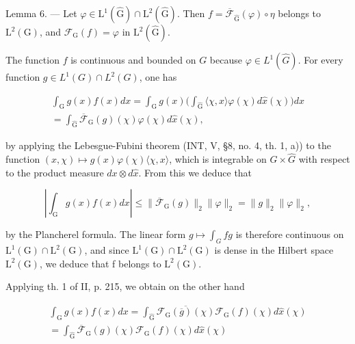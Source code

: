 Lemma 6. — Let \(\varphi\in\mathrm{L}^{1}(\widehat{\mathrm{G}})\cap\mathrm{L}^{2}(\widehat{\mathrm{G}})\). Then \(f=\overline{\mathcal{F}}_{\widehat{\mathrm{G}}}(\varphi)\circ\eta\) belongs to \(\mathrm{L}^{2}(\mathrm{G})\), and \(\mathcal{F}_{\mathrm{G}}(f)=\varphi\) in \(\mathrm{L}^{2}(\widehat{\mathrm{G}})\).

The function \(f\) is continuous and bounded on \(G\) because \(\varphi \in L^{1}(\widehat{G})\). For every function \(g \in L^{1}(G) \cap L^{2}(G)\), one has

\[
\begin{array}{r} \int_ {\mathrm{G}} g (x) f (x) d x = \int_ {\mathrm{G}} g (x) \Big (\int_ {\widehat {\mathrm{G}}} \langle \chi , x \rangle \varphi (\chi) d \widehat {x} (\chi) \Big) d x \\ = \int_ {\widehat {\mathrm{G}}} \overline {{\mathcal {F}}} _ {\mathrm{G}} (g) (\chi) \varphi (\chi) d \widehat {x} (\chi), \end{array}\tag{28}
\]

by applying the Lebesgue-Fubini theorem (INT, V, §8, no. 4, th. 1, a)) to the function \((x,\chi)\mapsto g(x)\varphi(\chi)\langle\chi,x\rangle\), which is integrable on \(G\times\widehat{G}\) with respect to the product measure \(dx\otimes d\widehat{x}\). From this we deduce that

\[
\left| \int_ {\mathrm{G}} g (x) f (x) d x \right| \leqslant \| \overline {{{\mathcal {F}}}} _ {\mathrm{G}} (g) \| _ {2} \| \varphi \| _ {2} = \| g \| _ {2} \| \varphi \| _ {2},
\]

by the Plancherel formula. The linear form \(g \mapsto \int_{G} fg\) is therefore continuous on \(\mathrm{L}^{1}(\mathrm{G}) \cap \mathrm{L}^{2}(\mathrm{G})\), and since \(\mathrm{L}^{1}(\mathrm{G}) \cap \mathrm{L}^{2}(\mathrm{G})\) is dense in the Hilbert space \(\mathrm{L}^{2}(\mathrm{G})\), we deduce that f belongs to \(\mathrm{L}^{2}(\mathrm{G})\).

Applying th. 1 of II, p. 215, we obtain on the other hand

\[
\begin{array}{r} \int_ {\mathrm{G}} g (x) f (x) d x = \int_ {\widehat {\mathrm{G}}} \overline {{\mathcal {F} _ {\mathrm{G}} (\overline {{g}}) (\chi)}} \mathcal {F} _ {\mathrm{G}} (f) (\chi) d \widehat {x} (\chi) \\ = \int_ {\widehat {\mathrm{G}}} \overline {{\mathcal {F}}} _ {\mathrm{G}} (g) (\chi) \mathcal {F} _ {\mathrm{G}} (f) (\chi) d \widehat {x} (\chi) \end{array}
\]

